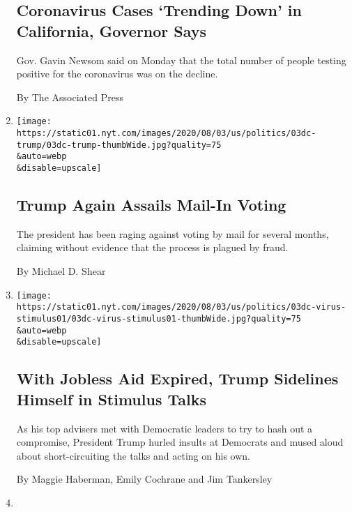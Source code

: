 \begin{enumerate}
{  \subsection{Coronavirus Cases `Trending Down' in California, Governor
  Says}\label{coronavirus-cases-trending-down-in-california-governor-says}}

  Gov. Gavin Newsom said on Monday that the total number of people
  testing positive for the coronavirus was on the decline.

  By The Associated Press
\item
  \href{/2020/08/03/us/politics/trump-mail-in-voting.html}{}

  \texttt{[image: https://static01.nyt.com/images/2020/08/03/us/politics/03dc-trump/03dc-trump-thumbWide.jpg?quality=75\\\&auto=webp\\\&disable=upscale]}

  \hypertarget{trump-again-assails-mail-in-voting}{%
  \subsection{Trump Again Assails Mail-In
  Voting}\label{trump-again-assails-mail-in-voting}}

  The president has been raging against voting by mail for several
  months, claiming without evidence that the process is plagued by
  fraud.

  By Michael D. Shear
\item
  \href{/2020/08/03/us/politics/congress-jobless-aid-talks-trump.html}{}

  \texttt{[image: https://static01.nyt.com/images/2020/08/03/us/politics/03dc-virus-stimulus01/03dc-virus-stimulus01-thumbWide.jpg?quality=75\\\&auto=webp\\\&disable=upscale]}

  \hypertarget{with-jobless-aid-expired-trump-sidelines-himself-in-stimulus-talks}{%
  \subsection{With Jobless Aid Expired, Trump Sidelines Himself in
  Stimulus
  Talks}\label{with-jobless-aid-expired-trump-sidelines-himself-in-stimulus-talks}}

  As his top advisers met with Democratic leaders to try to hash out a
  compromise, President Trump hurled insults at Democrats and mused
  aloud about short-circuiting the talks and acting on his own.

  By Maggie Haberman, Emily Cochrane and Jim Tankersley
\item
  \href{/video/us/100000007271090/north-carolina-isaias-coronavirus.html}{}


\end{enumerate}
